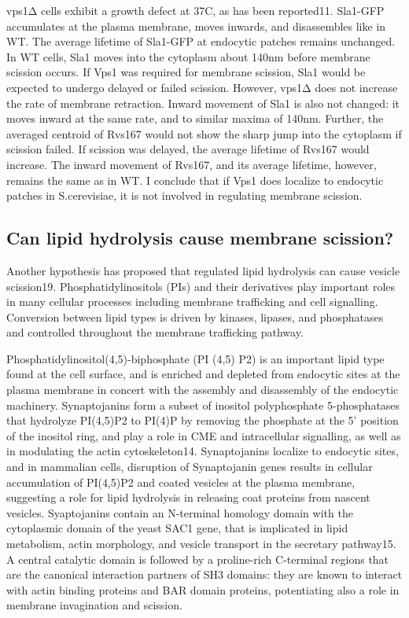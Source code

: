 	
	\vspace{5mm}
	vps1Δ cells exhibit a growth defect at 37C, as has been reported11. Sla1-GFP accumulates at the plasma membrane, moves inwards, and disassembles like in WT. The average lifetime of Sla1-GFP at endocytic patches remains unchanged. In WT cells, Sla1 moves into the cytoplasm about 140nm before membrane scission occurs. If Vps1 was required for membrane scission, Sla1 would be expected to undergo delayed or failed scission. However, vps1Δ does not increase the rate of membrane retraction. Inward movement of Sla1 is also not changed: it moves inward at the same rate, and to similar maxima of 140nm. Further, the averaged centroid of Rvs167 would not show the sharp jump into the cytoplasm if scission failed. If scission was delayed, the average lifetime of Rvs167 would increase. The inward movement of Rvs167, and its average lifetime, however, remains the same as in WT. I conclude that if Vps1 does localize to endocytic patches in S.cerevisiae, it is not involved in regulating membrane scission.  


	\subsection{Can lipid hydrolysis cause membrane scission?}
	Another hypothesis has proposed that regulated lipid hydrolysis can cause vesicle scission19. Phosphatidylinositols (PIs) and their derivatives play important roles in many cellular processes including membrane trafficking and cell signalling. Conversion between lipid types is driven by kinases, lipases, and phosphatases and controlled throughout the membrane trafficking pathway. 
	
	\vspace{5mm}
	Phosphatidylinositol(4,5)-biphosphate (PI (4,5) P2) is an important lipid type found at the cell surface, and is enriched and depleted from endocytic sites at the plasma membrane in concert with the assembly and disassembly of the endocytic machinery. Synaptojanins form a subset of inositol polyphosphate 5-phosphatases that hydrolyze PI(4,5)P2 to PI(4)P by removing the phosphate at the 5’ position of the inositol ring, and play a role in CME and intracellular signalling, as well as in modulating the actin cytoskeleton14. Synaptojanins localize to endocytic sites, and in mammalian cells, disruption of Synaptojanin genes results in cellular accumulation of PI(4,5)P2 and coated vesicles at the plasma membrane, suggesting a role for lipid hydrolysis in releasing coat proteins from nascent vesicles. Syaptojanins contain an N-terminal homology domain with the cytoplasmic domain of the yeast SAC1 gene, that is implicated in lipid metabolism, actin morphology, and vesicle transport in the secretary pathway15. A central catalytic domain is followed by a proline-rich C-terminal regions that are the canonical interaction partners of SH3 domains: they are known to interact with actin binding proteins and BAR domain proteins, potentiating also a role in membrane invagination and scission. 
		
